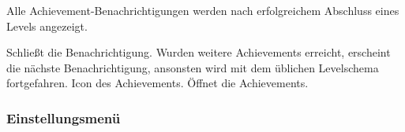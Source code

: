 \begin{center}
\setlength\fboxsep{20pt}
\setlength\fboxrule{1pt}
\end{center}

Alle Achievement-Benachrichtigungen werden nach erfolgreichem Abschluss eines Levels angezeigt.
\begin{requirements}
 Schließt die Benachrichtigung. Wurden weitere Achievements erreicht, erscheint die nächste Benachrichtigung, ansonsten wird mit dem üblichen Levelschema fortgefahren. 
 Icon des Achievements. Öffnet die Achievements.
\end{requirements} 

\subsubsection{Einstellungsmenü}

\begin{center}
\setlength\fboxsep{20pt}
\setlength\fboxrule{1pt}
\end{center}

